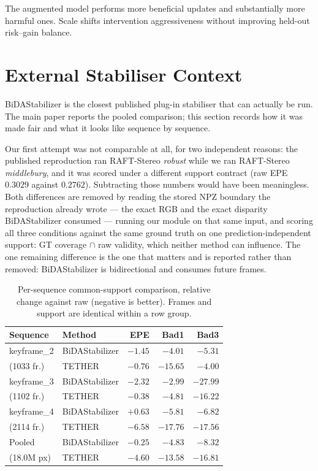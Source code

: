 \documentclass[letterpaper,10pt,conference]{ieeeconf}
\begin{document}
The augmented model performs more beneficial updates and substantially
more harmful ones. Scale shifts intervention aggressiveness without
improving held-out risk--gain balance.

\section{External Stabiliser Context}
\label{sec:bida}

BiDAStabilizer \cite{jing2024bida} is the closest published plug-in
stabiliser that can actually be run. The main paper reports the pooled
comparison; this section records how it was made fair and what it looks
like sequence by sequence.

Our first attempt was not comparable at all, for two independent reasons:
the published reproduction ran RAFT-Stereo \emph{robust} while we ran
RAFT-Stereo \emph{middlebury}, and it was scored under a different
support contract (raw EPE $0.3029$ against $0.2762$). Subtracting those
numbers would have been meaningless. Both differences are removed by
reading the stored NPZ boundary the reproduction already wrote --- the
exact RGB and the exact disparity BiDAStabilizer consumed --- running our
module on that same input, and scoring all three conditions against the
same ground truth on one prediction-independent support: GT coverage
$\cap$ raw validity, which neither method can influence. The one
remaining difference is the one that matters and is reported rather than
removed: BiDAStabilizer is bidirectional and consumes future frames.

\begin{table}[!htb]
\centering
\caption{Per-sequence common-support comparison, relative change against
raw (negative is better). Frames and support are identical within a row
group.}
\label{tab:bida_per_seq}
\setlength{\tabcolsep}{4pt}
\footnotesize
\begin{tabular}{@{}llrrr@{}}
\toprule
Sequence & Method & EPE & Bad1 & Bad3 \\
\midrule
keyframe\_2 & BiDAStabilizer & $\mathbf{-1.45}$ & $-4.01$ & $\mathbf{-5.31}$ \\
(1033 fr.)  & TETHER         & $-0.76$ & $\mathbf{-15.65}$ & $-4.00$ \\
\midrule
keyframe\_3 & BiDAStabilizer & $\mathbf{-2.32}$ & $-2.99$ & $\mathbf{-27.99}$ \\
(1102 fr.)  & TETHER         & $-0.38$ & $\mathbf{-4.81}$ & $-16.22$ \\
\midrule
keyframe\_4 & BiDAStabilizer & $+0.63$ & $-5.81$ & $-6.82$ \\
(2114 fr.)  & TETHER         & $\mathbf{-6.58}$ & $\mathbf{-17.76}$ & $\mathbf{-17.56}$ \\
\midrule
Pooled      & BiDAStabilizer & $-0.25$ & $-4.83$ & $-8.32$ \\
(18.0M px)  & TETHER         & $\mathbf{-4.60}$ & $\mathbf{-13.58}$ & $\mathbf{-16.81}$ \\
\bottomrule
\end{tabular}
\end{table}
\end{document}
